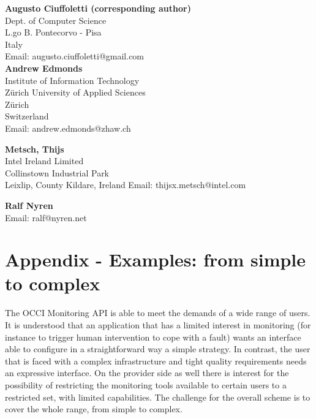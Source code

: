 \documentclass[10pt]{article}  %
\begin{document}
\textbf{Augusto Ciuffoletti (corresponding author)} \\
Dept. of Computer Science \\
L.go B. Pontecorvo - Pisa\\
Italy \\
Email: augusto.ciuffoletti@gmail.com \\

\textbf{Andrew Edmonds}\\
Institute of Information Technology \\
Zürich University of Applied Sciences \\
Zürich \\
Switzerland \\
Email: andrew.edmonds@zhaw.ch

\textbf{Metsch, Thijs} \\
Intel Ireland Limited \\
Collinstown Industrial Park \\
Leixlip, County Kildare, Ireland
Email: thijsx.metsch@intel.com

\textbf{Ralf Nyren} \\
Email: ralf@nyren.net 



\appendix

\section*{Appendix - Examples: from simple to complex}

The OCCI Monitoring API is able to meet the demands of a wide range of users. It is understood that an application that has a limited interest in monitoring (for instance to trigger human intervention to cope with a fault) wants an interface able to configure in a straightforward way a simple strategy. In contrast, the user that is faced with a complex infrastructure and tight quality requirements needs an expressive interface. On the provider side as well there is interest for the possibility of restricting the monitoring tools available to certain users to a restricted set, with limited capabilities. The challenge for the overall scheme is to cover the whole range, from simple to complex.
\end{document}
